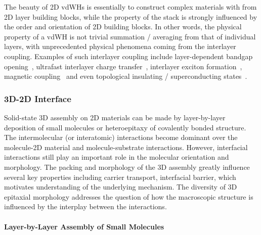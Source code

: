 The beauty of 2D vdWHs is essentially to construct complex materials
with from 2D layer building blocks, while the property of the stack is
strongly influenced by the order and orientation of 2D building
blocks.
%
In other words, the physical property of a vdWH is not trivial
summation / averaging from that of individual layers, with
unprecedented physical phenomena coming from the interlayer coupling.
%
Examples of such interlayer coupling include layer-dependent bandgap
opening~\cite{Mak_2010_mos2,Raja_2017}, ultra\-fast interlayer charge
transfer~\cite{Hong_2014_ultrafast_e_MoS2WS2,Zheng_2017_ultrafast_CT},
interlayer exciton formation~\cite{Latini_2017_interlayer_ex},
magnetic coupling~\cite{Huang_2017_magnet} and even topological
insulating / superconducting
states~\cite{Cao_2018_insulator,Cao_2018_supercond}.


\subsubsection{3D-2D Interface}
\label{sec:intro-3D-2D}

Solid-state 3D assembly on 2D materials can be made by layer-by-layer
deposition of small molecules or hetero\-epitaxy of covalently bonded
structure. The intermolecular (or interatomic) interactions become
dominant over the molecule-2D material and molecule-substrate
interactions. However, interfacial interactions still play an
important role in the molecular orientation and morphology. The
packing and morphology of the 3D assembly greatly influence several
key properties including carrier transport, interfacial barrier, which
motivates understanding of the underlying mechanism.  The diversity of
3D epitaxial morphology addresses the question of how the macroscopic
structure is influenced by the interplay between the interactions.


\paragraph{Layer-by-Layer Assembly of Small Molecules}
\label{sec:org2cdd8f0}

